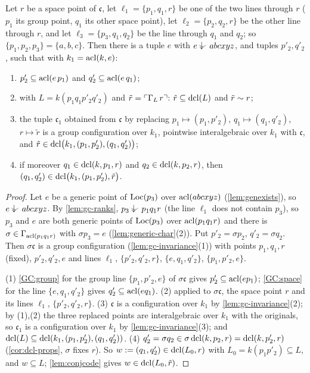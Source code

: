 \begin{lemma}\label{lem:defstep}
Let $r$ be a space point of $\mathfrak c$, let $\ell_1=\{p_1,q_1,r\}$ be one of the two
lines through $r$ ($p_1$ its group point, $q_1$ its other space point), let
$\ell_2=\{p_2,q_2,r\}$ be the other line through $r$, and let $\ell_3=\{p_3,q_1,q_2\}$
be the line through $q_1$ and $q_2$; so $\{p_1,p_2,p_3\}=\{a,b,c\}$.  Then there is a
tuple $e$ with $e\ind{}abcxyz$, and tuples $p'_2,q'_2$, such that with $k_1=\operatorname{acl}(k,e)$:
\begin{enumerate}[nosep]
\item $p'_2\subseteq\operatorname{acl}(e\,p_1)$ and $q'_2\subseteq\operatorname{acl}(e\,q_1)$;
\item with $L=k(p_1q_1p'_2q'_2)$ and $\tilde r=\ulcorner \Gamma_L\,r\urcorner$: $\tilde r\subseteq\operatorname{dcl}(L)$
  and $\tilde r\sim r$;
\item the tuple $\mathfrak c_1$ obtained from $\mathfrak c$ by replacing
  $p_1\mapsto(p_1,p'_2)$, $q_1\mapsto(q_1,q'_2)$, $r\mapsto\tilde r$ is a group configuration
  over $k_1$, pointwise interalgebraic over $k_1$ with $\mathfrak c$, and
  $\tilde r\in\operatorname{dcl}\bigl(k_1,(p_1,p'_2),(q_1,q'_2)\bigr)$;
\item if moreover $q_1\in\operatorname{dcl}(k,p_1,r)$ and $q_2\in\operatorname{dcl}(k,p_2,r)$, then
  $(q_1,q'_2)\in\operatorname{dcl}\bigl(k_1,(p_1,p'_2),\tilde r\bigr)$.
\end{enumerate}
\end{lemma}
\begin{proof}
Let $e$ be a generic point of $\operatorname{Loc}(p_3)$ over $\operatorname{acl}(abcxyz)$ (\cref{lem:genexists}),
so $e\ind{}abcxyz$.  By \cref{lem:gc-ranks}, $p_3\ind{}p_1q_1r$ (the line $\ell_1$ does
not contain $p_3$), so $p_3$ and $e$ are both generic points of $\operatorname{Loc}(p_3)$ over
$\operatorname{acl}(p_1q_1r)$ and there is $\sigma\in\Gamma_{\operatorname{acl}(p_1q_1r)}$ with $\sigma p_3=e$
(\cref{lem:generic-char}(2)).  Put $p'_2=\sigma p_2$, $q'_2=\sigma q_2$.  Then
$\sigma\mathfrak c$ is a group configuration (\cref{lem:gc-invariance}(1)) with points
$p_1,q_1,r$ (fixed), $p'_2,q'_2,e$ and lines $\ell_1$, $\{p'_2,q'_2,r\}$, $\{e,q_1,q'_2\}$,
$\{p_1,p'_2,e\}$.

(1) \ref{GC:group} for the group line $\{p_1,p'_2,e\}$ of $\sigma\mathfrak c$ gives
$p'_2\subseteq\operatorname{acl}(ep_1)$; \ref{GC:space} for the line $\{e,q_1,q'_2\}$ gives
$q'_2\subseteq\operatorname{acl}(eq_1)$.
(2)  applied to $\sigma\mathfrak c$, the space point $r$ and its lines
$\ell_1$, $\{p'_2,q'_2,r\}$.
(3) $\mathfrak c$ is a configuration over $k_1$ by \cref{lem:gc-invariance}(2); by (1),(2)
the three replaced points are interalgebraic over $k_1$ with the originals, so
$\mathfrak c_1$ is a configuration over $k_1$ by \cref{lem:gc-invariance}(3); and
$\operatorname{dcl}(L)\subseteq\operatorname{dcl}(k_1,(p_1,p'_2),(q_1,q'_2))$.
(4) $q'_2=\sigma q_2\in\sigma\operatorname{dcl}(k,p_2,r)=\operatorname{dcl}(k,p'_2,r)$ (\cref{cor:dcl-props}, $\sigma$
fixes $r$).  So $w:=(q_1,q'_2)\in\operatorname{dcl}(L_0,r)$ with $L_0=k(p_1p'_2)\subseteq L$, and
$w\subseteq L$; \cref{lem:conjcode} gives $w\in\operatorname{dcl}(L_0,\tilde r)$.
\end{proof}


